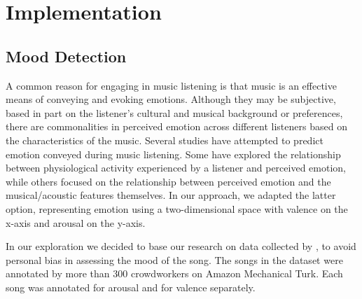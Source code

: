 
\chapter{Implementation} %

\label{Chapter3} %



\section{Mood Detection}

A common reason for engaging in music listening is that music is an effective means of conveying and evoking emotions. Although they may be subjective, based in part on the listener’s cultural and musical background or preferences, there are commonalities in perceived emotion across different listeners based on the characteristics of the music. Several studies have attempted to predict emotion conveyed during music listening. Some have explored the relationship between physiological activity experienced by a listener and perceived emotion, while others focused on the relationship between perceived emotion and the musical/acoustic features themselves. In our approach, we adapted the latter option, representing emotion using a two-dimensional space with valence on the x-axis and arousal on the y-axis.

In our exploration we decided to base our research on data collected by \cite{1000songs}, to avoid personal bias in assessing the mood of the song. The songs in the dataset were annotated by more than 300 crowdworkers on Amazon Mechanical Turk. Each song was annotated for arousal and for valence separately.


